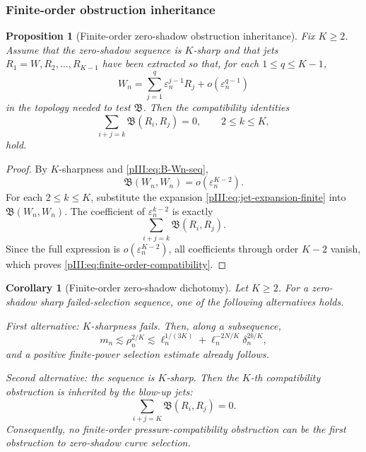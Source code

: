 \documentclass[11pt]{article}
\numberwithin{equation}{section}
\theoremstyle{plain}
\newtheorem{proposition}{Proposition}[section]
\newtheorem{corollary}{Corollary}[section]
\theoremstyle{definition}
\theoremstyle{remark}
\newcommand{\eps}{\varepsilon}
\newcommand{\calB}{\mathfrak B}
\begin{document}
\subsubsection{Finite-order obstruction inheritance}

\begin{proposition}[Finite-order zero-shadow obstruction inheritance]
\label{pIII:prop:finite-order-obstruction-inheritance}
Fix \(K\ge2\).  Assume that the zero-shadow sequence is \(K\)-sharp and that jets
\(R_1=W,R_2,\ldots,R_{K-1}\) have been extracted so that, for each \(1\le q\le K-1\),
\begin{equation}\label{pIII:eq:jet-expansion-finite}
        W_n=
        \sum_{j=1}^{q}\eps_n^{j-1}R_j
        +o(\eps_n^{q-1})
\end{equation}
in the topology needed to test \(\calB\).  Then the compatibility identities
\begin{equation}\label{pIII:eq:finite-order-compatibility}
        \sum_{i+j=k}\calB(R_i,R_j)=0,
        \qquad
        2\le k\le K,
\end{equation}
hold.
\end{proposition}

\begin{proof}
By \(K\)-sharpness and \eqref{pIII:eq:B-Wn-seq},
\[
        \calB(W_n,W_n)=o(\eps_n^{K-2}).
\]
For each \(2\le k\le K\), substitute the expansion \eqref{pIII:eq:jet-expansion-finite} into
\(\calB(W_n,W_n)\).  The coefficient of \(\eps_n^{k-2}\) is exactly
\[
        \sum_{i+j=k}\calB(R_i,R_j).
\]
Since the full expression is \(o(\eps_n^{K-2})\), all coefficients through order \(K-2\)
vanish, which proves \eqref{pIII:eq:finite-order-compatibility}.
\end{proof}

\begin{corollary}[Finite-order zero-shadow dichotomy]
\label{pIII:cor:finite-order-zero-shadow-dichotomy}
Let \(K\ge2\).  For a zero-shadow sharp failed-selection sequence, one of the following
alternatives holds.

\emph{First alternative:} \(K\)-sharpness fails.  Then, along a subsequence,
\[
        m_n\lesssim \rho_n^{2/K}
        \lesssim
        \ell_n^{1/(3K)}+
        \ell_n^{-2N/K}\delta_n^{2b/K},
\]
and a positive finite-power selection estimate already follows.

\emph{Second alternative:} the sequence is \(K\)-sharp.  Then the \(K\)-th compatibility
obstruction is inherited by the blow-up jets:
\[
        \sum_{i+j=K}\calB(R_i,R_j)=0.
\]
Consequently, no finite-order pressure-compatibility obstruction can be the first
obstruction to zero-shadow curve selection.
\end{corollary}
\end{document}
